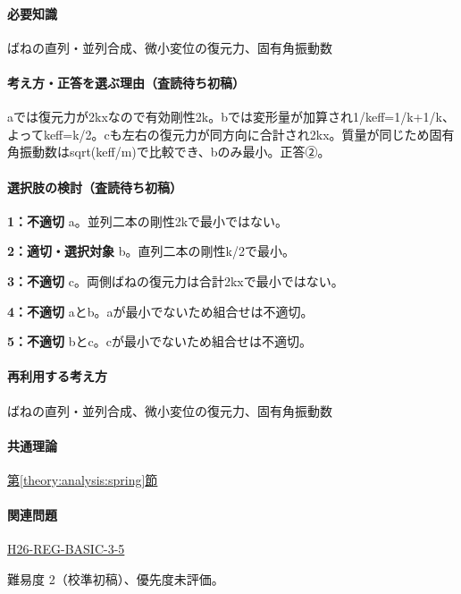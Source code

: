 \paragraph{必要知識} ばねの直列・並列合成、微小変位の復元力、固有角振動数

\paragraph{考え方・正答を選ぶ理由（査読待ち初稿）} aでは復元力が2kxなので有効剛性2k。bでは変形量が加算され1/keff=\allowbreak{}1/k+1/k、よってkeff=\allowbreak{}k/2。cも左右の復元力が同方向に合計され2kx。質量が同じため固有角振動数はsqrt(keff/m)で比較でき、bのみ最小。正答②。

\paragraph{選択肢の検討（査読待ち初稿）}\mbox{}\par

\noindent\textbf{1：不適切} a。並列二本の剛性2kで最小ではない。\par

\noindent\textbf{2：適切・選択対象} b。直列二本の剛性k/2で最小。\par

\noindent\textbf{3：不適切} c。両側ばねの復元力は合計2kxで最小ではない。\par

\noindent\textbf{4：不適切} aとb。aが最小でないため組合せは不適切。\par

\noindent\textbf{5：不適切} bとc。cが最小でないため組合せは不適切。\par

\paragraph{再利用する考え方} ばねの直列・並列合成、微小変位の復元力、固有角振動数

\paragraph{共通理論} \hyperref[theory:analysis:spring]{第\ref*{theory:analysis:spring}節}

\paragraph{関連問題} \hyperref[q:h26-reg-basic-3-5]{H26-REG-BASIC-3-5}

\par 難易度 2（校準初稿）、優先度未評価。
